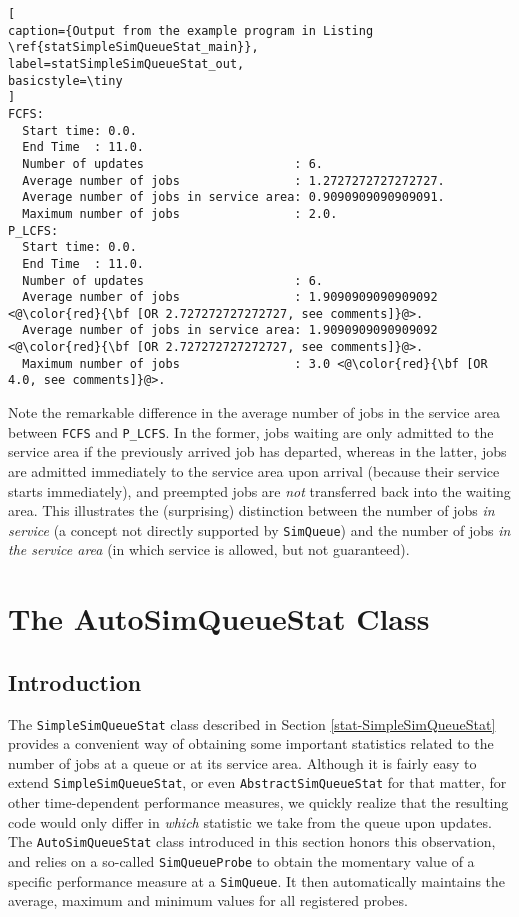 \documentclass[12pt]{book}
\begin{document}
\begin{lstlisting}[
caption={Output from the example program in Listing \ref{statSimpleSimQueueStat_main}},
label=statSimpleSimQueueStat_out,
basicstyle=\tiny
]
FCFS:
  Start time: 0.0.
  End Time  : 11.0.
  Number of updates                     : 6.
  Average number of jobs                : 1.2727272727272727.
  Average number of jobs in service area: 0.9090909090909091.
  Maximum number of jobs                : 2.0.
P_LCFS:
  Start time: 0.0.
  End Time  : 11.0.
  Number of updates                     : 6.
  Average number of jobs                : 1.9090909090909092 <@\color{red}{\bf [OR 2.727272727272727, see comments]}@>.
  Average number of jobs in service area: 1.9090909090909092 <@\color{red}{\bf [OR 2.727272727272727, see comments]}@>.
  Maximum number of jobs                : 3.0 <@\color{red}{\bf [OR 4.0, see comments]}@>.
\end{lstlisting}

Note the remarkable difference in the average number of jobs in the service area between
  \lstinline|FCFS| and \lstinline|P_LCFS|.
In the former, jobs waiting are only admitted to the service area if the previously arrived job
  has departed, whereas in the latter,
  jobs are admitted immediately to the service area upon arrival (because their service
  starts immediately), and preempted jobs are {\em not\/} transferred back into the waiting area.
This illustrates the (surprising) distinction between the number of jobs {\em in service\/}
  (a concept not directly supported by \lstinline|SimQueue|)
  and the number of jobs {\em in the service area\/}
  (in which service is allowed, but not guaranteed).

\section{The AutoSimQueueStat Class}
\label{stat-autosimqueuestat}

\subsection{Introduction}
\label{stat-autosimqueuestat-intro}

The \lstinline|SimpleSimQueueStat| class
  described in Section \ref{stat-SimpleSimQueueStat}
  provides a convenient way of obtaining some important
  statistics related to the number of jobs at a queue
  or at its service area.
Although it is fairly easy to extend \lstinline|SimpleSimQueueStat|,
  or even \lstinline|AbstractSimQueueStat| for that matter,
  for other time-dependent performance measures,
  we quickly realize that the resulting code would only differ
  in {\em which\/} statistic we take from the queue upon updates.
The \lstinline|AutoSimQueueStat| class introduced in this section
  honors this observation, and relies on a so-called
  \lstinline|SimQueueProbe| to obtain the momentary value of
  a specific performance measure at a \lstinline|SimQueue|.
It then automatically maintains the average, maximum and minimum
  values for all registered probes.
\end{document}

